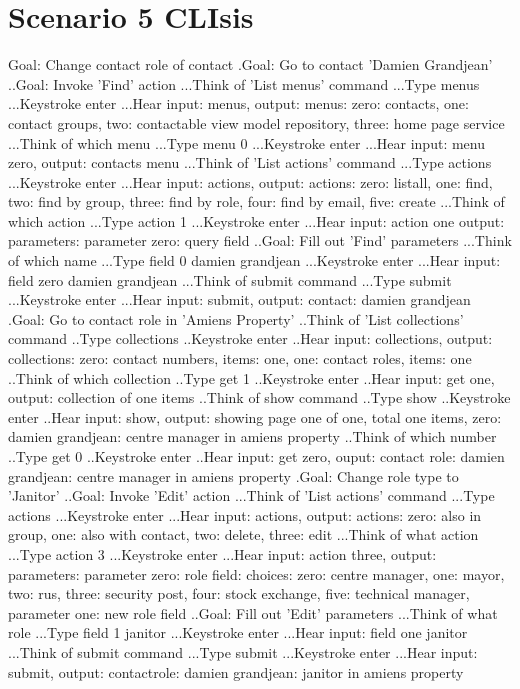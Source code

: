 \section{Scenario 5 CLIsis}
\label{section:scenario5clisis}
\begin{spverbatim}
Goal: Change contact role of contact
.Goal: Go to contact 'Damien Grandjean'
..Goal: Invoke 'Find' action
...Think of 'List menus' command
...Type menus
...Keystroke enter 
...Hear input: menus, output: menus: zero: contacts, one: contact groups, two: contactable view model repository, three: home page service
...Think of which menu
...Type menu 0
...Keystroke enter
...Hear input: menu zero, output: contacts menu
...Think of 'List actions' command
...Type actions
...Keystroke enter
...Hear input: actions, output: actions: zero: listall, one: find, two: find by group, three: find by role, four: find by email, five: create
...Think of which action
...Type action 1
...Keystroke enter
...Hear input: action one output: parameters: parameter zero: query field
..Goal: Fill out 'Find' parameters
...Think of which name
...Type field 0 damien grandjean
...Keystroke enter
...Hear input: field zero damien grandjean
...Think of submit command
...Type submit
...Keystroke enter
...Hear input: submit, output: contact: damien grandjean
.Goal: Go to contact role in 'Amiens Property'
..Think of 'List collections' command
..Type collections
..Keystroke enter
..Hear input: collections, output: collections: zero: contact numbers, items: one, one: contact roles, items: one
..Think of which collection
..Type get 1
..Keystroke enter
..Hear input: get one, output: collection of one items
..Think of show command
..Type show
..Keystroke enter
..Hear input: show, output: showing page one of one, total one items, zero: damien grandjean: centre manager in amiens property
..Think of which number
..Type get 0
..Keystroke enter
..Hear input: get zero, ouput: contact role: damien grandjean: centre manager in amiens property
.Goal: Change role type to 'Janitor'
..Goal: Invoke 'Edit' action
...Think of 'List actions' command
...Type actions
...Keystroke enter
...Hear input: actions, output: actions: zero: also in group, one: also with contact, two: delete, three: edit
...Think of what action
...Type action 3
...Keystroke enter
...Hear input: action three, output: parameters: parameter zero: role field: choices: zero: centre manager, one: mayor, two: rus, three: security post, four: stock exchange, five: technical manager, parameter one: new role field
..Goal: Fill out 'Edit' parameters
...Think of what role
...Type field 1 janitor
...Keystroke enter
...Hear input: field one janitor
...Think of submit command
...Type submit
...Keystroke enter
...Hear input: submit, output: contactrole: damien grandjean: janitor in amiens property
\end{spverbatim}